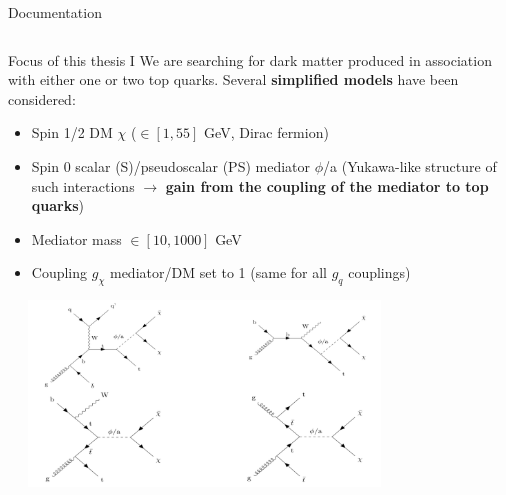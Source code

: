 \documentclass[8pt]{beamer}
\begin{document}
\begin{frame}{Documentation}
\begin{columns}
\begin{column}{0.5\textwidth}
	\end{column}
\end{columns}
\end{frame}

\begin{frame}{Focus of this thesis I}
\justifying
We are searching for \alert{dark matter produced in association with either one or two top quarks}. Several \textbf{simplified models} have been considered:

\begin{itemize} 
	\justifying
	\item Spin 1/2 DM $\chi$ ($\in [1, 55]$ GeV, Dirac fermion) \\
	\item Spin 0 scalar (S)/pseudoscalar (PS) mediator $\phi$/a (Yukawa-like structure of such interactions $\rightarrow$ \textbf{gain from the coupling of the mediator to top quarks}) \\
	\item Mediator mass $\in [10, 1000]$ GeV \\
	\item Coupling $g_{\chi}$ mediator/DM set to 1 (same for all $g_q$ couplings) \\
\end{itemize}\vfill

\begin{center}
\includegraphics[width=0.78\textwidth, height=140pt]{figs/AllFeynman.png}
\end{center}


\end{frame}
\end{document}

